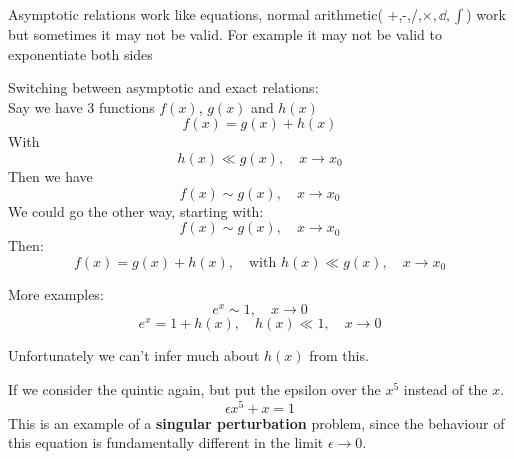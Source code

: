 \documentclass{X:/Documents/Coding/Latex/myassignment}
\begin{document}
Asymptotic relations work like equations, normal arithmetic( +,-,/,$\times, \dd{}{},\int$) work but sometimes it may not be valid. For example it may not be valid to exponentiate both sides

Switching between asymptotic and exact relations:\\
Say we have 3 functions $f(x)$, $g(x)$ and $h(x)$
\[f(x) = g(x) + h(x)\]
With
\[h(x) \ll g(x), \quad x\to x_0\]
Then we have
\[f(x) \sim g(x), \quad x\to x_0\]
We could go the other way, starting with:
\[f(x) \sim g(x), \quad x\to x_0\]
Then:
\[f(x) = g(x) + h(x), \quad \text{with } h(x)\ll g(x), \quad x\to x_0\]


More examples:
\[e^x \sim 1, \quad x\to0\]
\[e^x = 1 + h(x), \quad h(x)\ll 1, \quad x\to0\]

Unfortunately we can't infer much about $h(x)$ from this.

If we consider the quintic again, but put the epsilon over the $x^5$ instead of the $x$.
\[\epsilon x^5 + x =1\]
This is an example of a \textbf{singular perturbation} problem, since the behaviour of this equation is fundamentally different in the limit $\epsilon\to 0$. 
\end{document}
